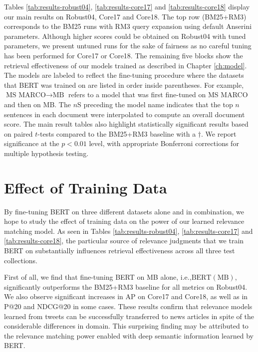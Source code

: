 Tables \ref{tab:results-robust04}, \ref{tab:results-core17} and \ref{tab:results-core18} display our main results on Robust04, Core17 and Core18.
The top row (BM25+RM3) corresponds to the BM25 runs with RM3 query expansion using default Anserini parameters.
Although higher scores could be obtained on Robust04 with tuned parameters, we present untuned runs for the sake of fairness as no careful tuning has been performed for Core17 or Core18.
The remaining five blocks show the retrieval effectiveness of our models trained as described in Chapter \ref{ch:model}.
The models are labeled to reflect the fine-tuning procedure where the datasets that BERT was trained on are listed in order inside parentheses.
For example, $\textrm{MS MARCO}\rightarrow\textrm{MB}$ refers to a model that was first fine-tuned on MS MARCO and then on MB.
The $ n $S preceding the model name indicates that the top $ n $ sentences in each document were interpolated to compute an overall document score.
The main result tables also highlight statistically significant results based on paired $ t $-tests compared to the BM25+RM3 baseline with a $ {\dagger} $.
We report significance at the $ p < 0.0 1 $ level, with appropriate Bonferroni corrections for multiple hypothesis testing.

\section{Effect of Training Data}

By fine-tuning BERT on three different datasets alone and in combination, we hope to study the effect of training data on the power of our learned relevance matching model.
As seen in Tables \ref{tab:results-robust04}, \ref{tab:results-core17} and \ref{tab:results-core18}, the particular source of relevance judgments that we train BERT on substantially influences retrieval effectiveness across all three test collections.

First of all, we find that fine-tuning BERT on MB alone, i.e.,$ \textrm{BERT}(\textrm{MB}) $, significantly outperforms the BM25+RM3 baseline for all metrics on Robust04.
We also observe significant increases in AP on Core17 and Core18, as well as in P@20 and NDCG@20 in some cases.
These results confirm that relevance models learned from tweets can be successfully transferred to news articles in spite of the considerable differences in domain.
This surprising finding may be attributed to the relevance matching power enabled with deep semantic information learned by BERT.

